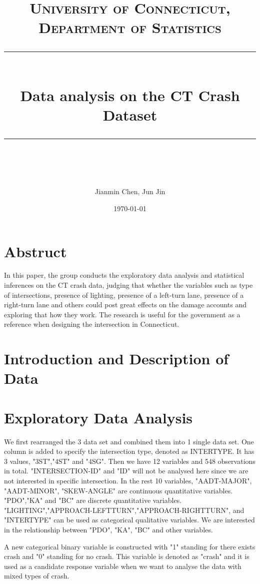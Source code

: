 \documentclass[11pt]{scrartcl} %
\title{	
	\normalfont\normalsize
	\textsc{University of Connecticut, Department of Statistics}\\ %
	\vspace{25pt} %
	\rule{\linewidth}{0.5pt}\\ %
	\vspace{20pt} %
	{\huge Data analysis on the CT Crash Dataset}\\ %
	\vspace{12pt} %
	\rule{\linewidth}{2pt}\\ %
	\vspace{12pt} %
}
\author{\LARGE Jianmin Chen, Jun Jin} %
\date{\normalsize\today} %
\begin{document}
\maketitle %


\tableofcontents


\section{Abstruct}

In this paper, the group conducts the exploratory data analysis and statistical inferences on the CT crash data, judging that whether the variables such as type of intersections, presence of lighting, presence of a left-turn lane, presence of a right-turn lane and others could post great effects on the damage accounts and exploring that how they work. The research is useful for the government as a reference when designing the intersection in Connecticut.


\section{Introduction and Description of Data}




\section{Exploratory Data Analysis}
We first rearranged the 3 data set and combined them into 1 single data set. One column is added to specify the intersection type, denoted as INTERTYPE. It has 3 values, "3ST","4ST" and "4SG". Then we have 12 variables and 548 observations in total. "INTERSECTION-ID" and "ID" will not be analysed here since we are not interested in specific intersection. In the rest 10 variables, "AADT-MAJOR", "AADT-MINOR", "SKEW-ANGLE" are continuous quantitative variables. "PDO","KA" and "BC" are discrete  quantitative variables. "LIGHTING","APPROACH-LEFTTURN","APPROACH-RIGHTTURN", and "INTERTYPE" can be used as categorical qualitative variables. We are interested in the relationship between "PDO", "KA", "BC" and other variables.

A new categorical binary variable is constructed with "1" standing for there exists crash and "0" standing for no crash. This variable is denoted as "crash" and it is used as a candidate response variable when we want to analyse the data with mixed types of crash.
\end{document}
